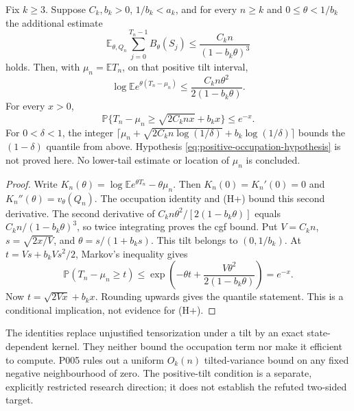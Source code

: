 \begin{corollary}
\label{cor:positive-tilt-criterion}
Fix $k\ge3$. Suppose $C_k,b_k>0$, $1/b_k<a_k$, and for every
$n\ge k$ and $0\le\theta<1/b_k$ the additional estimate
\begin{equation}
 \mathbb E_{\theta,Q_n}\sum_{j=0}^{T_n-1}B_\theta(S_j)
       \le\frac{C_k n}{(1-b_k\theta)^3}
 \tag{H+}\label{eq:positive-occupation-hypothesis}
\end{equation}
holds. Then, with $\mu_n=\mathbb ET_n$, on that positive tilt interval,
\[
 \log\mathbb E e^{\theta(T_n-\mu_n)}
       \le\frac{C_k n\theta^2}{2(1-b_k\theta)}.
\]
For every $x>0$,
\[
 \mathbb P\{T_n-\mu_n\ge\sqrt{2C_k n x}+b_kx\}\le e^{-x}.
\]
For $0<\delta<1$, the integer
$\lceil\mu_n+\sqrt{2C_k n\log(1/\delta)}
 +b_k\log(1/\delta)\rceil$
bounds the $(1-\delta)$ quantile from above.
Hypothesis \eqref{eq:positive-occupation-hypothesis} is not proved here.
No lower-tail estimate or location of $\mu_n$ is concluded.
\end{corollary}
\begin{proof}
Write $K_n(\theta)=\log\mathbb E e^{\theta T_n}-\theta\mu_n$.
Then $K_n(0)=K_n'(0)=0$ and $K_n''(\theta)=v_\theta(Q_n)$.
The occupation identity and (H+) bound this second derivative.
The second derivative of $C_k n\theta^2/[2(1-b_k\theta)]$ equals
$C_k n/(1-b_k\theta)^3$, so twice integrating proves the cgf bound.
Put $V=C_k n$, $s=\sqrt{2x/V}$, and $\theta=s/(1+b_ks)$.
This tilt belongs to $(0,1/b_k)$. At $t=Vs+b_kVs^2/2$,
Markov's inequality gives
\[
 \mathbb P(T_n-\mu_n\ge t)
 \le\exp\!\left(-\theta t+\frac{V\theta^2}{2(1-b_k\theta)}\right)
 =e^{-x}.
\]
Now $t=\sqrt{2Vx}+b_kx$. Rounding upwards gives the quantile statement.
This is a conditional implication, not evidence for (H+).
\end{proof}

\begin{remark}[Scope]
The identities replace unjustified tensorization under a tilt by an exact
state-dependent kernel. They neither bound the occupation term nor make
it efficient to compute. P005 rules out a uniform $O_k(n)$ tilted-variance
bound on any fixed negative neighbourhood of zero. The positive-tilt
condition is a separate, explicitly restricted research direction; it
does not establish the refuted two-sided target.
\end{remark}
